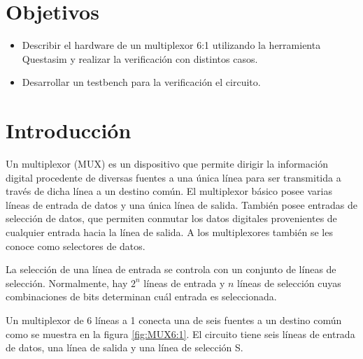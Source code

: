 \documentclass[9pt,technote]{IEEEtran}
\begin{document}
	
	\maketitle
	
	\section*{Objetivos}
	\begin{itemize}[]
	\item Describir el hardware de un multiplexor 6:1 utilizando la herramienta Questasim y realizar la verificación con distintos casos.
	\item Desarrollar un testbench para la verificación el circuito.
	\end{itemize}


	\section*{Introducción}
	Un multiplexor (MUX) es un dispositivo que permite dirigir la información digital procedente de diversas fuentes a una única línea para ser transmitida a través de dicha línea a un destino común. El multiplexor básico posee varias líneas de entrada de datos y una única línea de salida. También posee
	entradas de selección de datos, que permiten conmutar los datos digitales provenientes de cualquier entrada hacia la línea de salida. A los multiplexores también se les conoce como selectores de datos. \cite{floyd_fundamentos_nodate}
	
	La selección de una línea de entrada se controla con un conjunto de líneas de selección. Normalmente, hay $2^n$ líneas de entrada y $n$ líneas de selección cuyas combinaciones de bits determinan cuál entrada es seleccionada.\cite{mano_digital_2002}
	
	Un multiplexor de 6 líneas a 1 conecta una de seis fuentes a un destino común como se muestra en la figura \ref{fig:MUX6:1}. El circuito tiene seis líneas de entrada de datos, una línea de salida y una línea de selección S.
	
\end{document}

